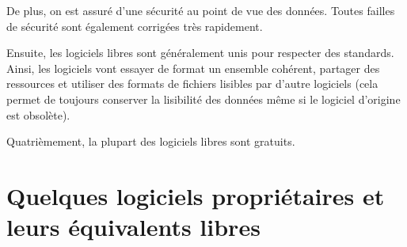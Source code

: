 \documentclass[10pt]{../fiche}
\begin{document}
De plus, on est assuré d'une sécurité au point de vue des données. Toutes failles de sécurité sont également corrigées très rapidement.

Ensuite, les logiciels libres sont généralement unis pour respecter des standards. Ainsi, les logiciels vont essayer de format un ensemble cohérent, partager des ressources et utiliser des formats de fichiers lisibles par d'autre logiciels (cela permet de toujours conserver la lisibilité des données même si le logiciel d'origine est obsolète). %

Quatrièmement, la plupart des logiciels libres sont gratuits.

\section*{Quelques logiciels propriétaires et leurs équivalents libres}
\end{document}
